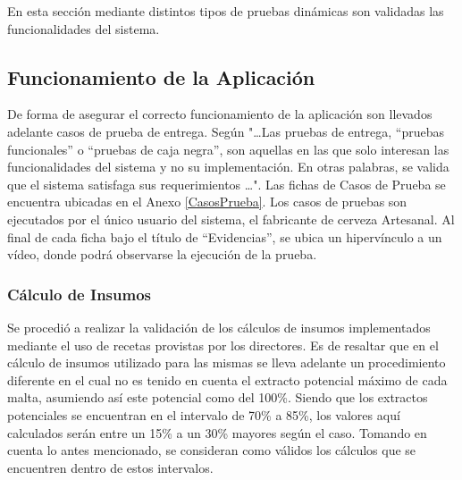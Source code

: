 \par En esta sección mediante distintos tipos de pruebas dinámicas son validadas las funcionalidades del sistema.

\subsection{Funcionamiento de la Aplicación}
De forma de asegurar el correcto funcionamiento de la aplicación son llevados adelante casos de prueba de entrega. Según \cite{Som05} "\ldots Las pruebas de entrega, “pruebas funcionales” o “pruebas de caja negra”, son aquellas en las que solo interesan las funcionalidades del sistema y no su implementación. En otras palabras, se valida que el sistema satisfaga sus requerimientos \ldots".
Las fichas de Casos de Prueba se encuentra ubicadas en el Anexo \ref{CasosPrueba}. Los casos de pruebas son ejecutados por el único usuario del sistema, el fabricante de cerveza Artesanal. Al final de cada ficha bajo el título de ``Evidencias'', se ubica un hipervínculo a un vídeo, donde podrá observarse la ejecución de la prueba.

\subsubsection{Cálculo de Insumos}
\par Se procedió a realizar la validación de los cálculos de insumos implementados mediante el uso de recetas provistas por los directores. Es de resaltar que en el cálculo de insumos utilizado para las mismas se lleva adelante un procedimiento diferente en el cual no es tenido en cuenta el extracto potencial máximo de cada malta, asumiendo así este potencial como del 100\%. Siendo que los extractos potenciales se encuentran en el intervalo de 70\% a 85\%, los valores aquí calculados serán entre un 15\% a un 30\% mayores según el caso. Tomando en cuenta lo antes mencionado, se consideran como válidos los cálculos que se encuentren dentro de estos intervalos.


